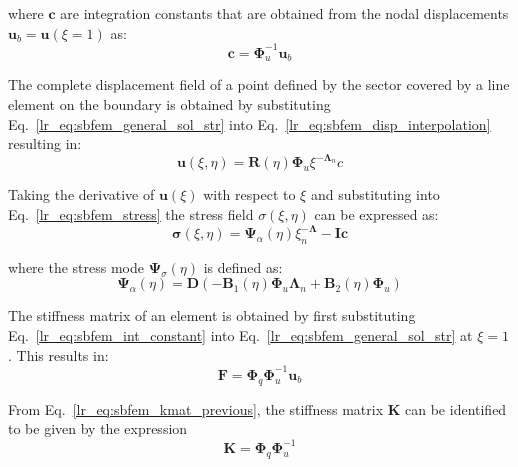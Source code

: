 where $\mathbf{c}$ are integration constants that are obtained from the nodal displacements $\mathbf{u}_b = \mathbf{u}(\xi=1)$ as:
\begin{equation}
    \mathbf{c} = \mathbf{\Phi}_u^{-1} \mathbf{u}_b
    \label{lr_eq:sbfem_int_constant}
\end{equation}

The complete displacement field of a point defined by the sector covered by a line element on the boundary is obtained by substituting Eq.~\ref{lr_eq:sbfem_general_sol_str} into Eq.~\ref{lr_eq:sbfem_disp_interpolation} resulting in:
\begin{equation}
    \mathbf{u}(\xi,\eta) = \mathbf{R}(\eta) \mathbf{\Phi}_u \xi ^{-\mathbf{\Lambda}_n} c
    \label{lr_eq:sbfem_displacement_field}
\end{equation}

Taking the derivative of $\mathbf{u}(\xi)$ with respect to $\xi$ and substituting into Eq.~\ref{lr_eq:sbfem_stress} the stress field $\sigma(\xi,\eta)$ can be expressed as:
\begin{equation}
    \mathbf{\sigma}(\xi,\eta) = \mathbf{\Psi}_\alpha (\eta) \xi^{-\mathbf\Lambda}_n - \mathbf{I} \mathbf{c}
    \label{lr_eq:sbfem_stress_field}
\end{equation}

where the stress mode $\mathbf{\Psi}_\sigma(\eta)$ is defined as:
\begin{equation}
    \mathbf{\Psi}_\alpha(\eta) =    \mathbf{D}(
                                       -\mathbf{B}_1(\eta) \mathbf{\Phi}_u \mathbf{\Lambda}_n +
                                        \mathbf{B}_2(\eta) \mathbf{\Phi}_u
                                    )
    \label{lr_eq:sbfem_stress_mode}
\end{equation}

The stiffness matrix of an element is obtained by first substituting Eq.~\ref{lr_eq:sbfem_int_constant} into Eq.~\ref{lr_eq:sbfem_general_sol_str} at $\xi=1$.
This results in:
\begin{equation}
    \mathbf{F} = \mathbf{\Phi}_q \mathbf{\Phi}_u^{-1} \mathbf{u}_b
    \label{lr_eq:sbfem_kmat_previous}
\end{equation}

From Eq.~\ref{lr_eq:sbfem_kmat_previous}, the stiffness matrix $\mathbf{K}$ can be identified to be given by the expression
\begin{equation}
    \mathbf{K} = \mathbf{\Phi}_q \mathbf{\Phi}_u^{-1}
    \label{lr_eq:sbfem_kmat}
\end{equation}

